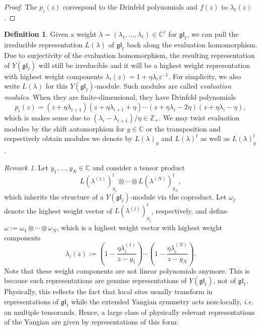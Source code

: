 \documentclass[11pt]{report}
\theoremstyle{definition}
\newtheorem{definition}[theorem]{Definition}
\theoremstyle{remark}
\newtheorem*{remark}{Remark}
\theoremstyle{remark}
\newcommand{\Z}{\mathbb{Z}}
\newcommand{\C}{\mathbb{C}}
\begin{document}
\begin{proof}
The $p_i(z)$ correspond to the Drinfeld polynomials and $f(z)$ to $\lambda_\ell(z)$.
\end{proof}

\begin{definition}
Given a weight $\lambda = (\lambda_1,...,\lambda_\ell) \in \C^\ell$ for $\mathfrak{gl}_\ell$, we can pull the irreducible representation $L(\lambda)$ of $\mathfrak{gl}_\ell$ back along the evaluation homomorphism. Due to surjectivity of the evaluation homomorphism, the resulting representation of $Y(\mathfrak{gl}_\ell)$ will still be irreducible and it will be a highest weight representation with highest weight components $\lambda_i(z) = 1 + \eta \lambda_i z^{-1}$. For simplicity, we also write $L(\lambda)$ for this $Y(\mathfrak{gl}_\ell)$-module. Such modules are called \emph{evaluation modules}. When they are finite-dimensional, they have Drinfeld polynomials
\begin{equation*}
p_i(z) = (z+\eta \lambda_{i+1})(z+\eta \lambda_{i+1}+\eta) \cdots (z+\eta \lambda_i-2\eta)(z+\eta \lambda_i-\eta),
\end{equation*}
which is makes sense due to $(\lambda_i - \lambda_{i+1})/\eta \in \Z_+$. We may twist evaluation modules by the shift automorphism for $y \in \C$ or the transposition and respectively obtain modules we denote by $L(\lambda)_y$ and $L(\lambda)^t$ as well as $L(\lambda)_y^t$.
\end{definition}

\begin{remark}
Let $y_1,...,y_N \in \C$ and consider a tensor product
\begin{equation*}
L(\lambda^{(1)})_{y_1}^t \otimes \cdots \otimes L(\lambda^{(N)})_{y_N}^t,
\end{equation*}
which inherits the structure of a $Y(\mathfrak{gl}_\ell)$-module via the coproduct. Let $\omega_j$ denote the highest weight vector of $L(\lambda^{(j)})_{y_j}^t$, respectively, and define $\omega := \omega_1 \otimes \cdots \otimes \omega_N$, which is a highest weight vector with highest weight components
\begin{equation*}
\lambda_i(z) := \left( 1 - \frac{\eta \lambda_i^{(1)}}{z-y_1} \right) \cdots \left( 1 - \frac{\eta \lambda_i^{(N)}}{z-y_N} \right).
\end{equation*}
Note that these weight components are not linear polynomials anymore. This is because such representations are genuine representations of $Y(\mathfrak{gl}_\ell)$, not of $\mathfrak{gl}_\ell$. Physically, this reflects the fact that local sites usually transform in representations of $\mathfrak{gl}_\ell$ while the extended Yangian symmetry acts non-locally, \emph{i.e.} on multiple tensorands. Hence, a large class of physically relevant representations of the Yangian are given by representations of this form:
\end{remark}
\end{document}
